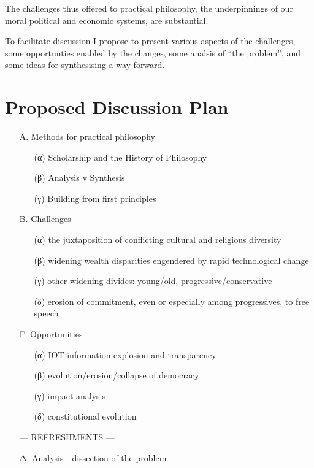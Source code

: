 \documentclass[14pt,titlepage]{extarticle}
\begin{document}
The challenges thus offered to practical philosophy, the underpinnings of our moral political and economic systems, are substantial.

To facilitate discussion I propose to present various aspects of the challenges, some opportunties enabled by the changes, some analsis of ``the problem'', and some ideas for synthesising a way forward.


\pagebreak

\section*{Proposed Discussion Plan}

\begin{itemize}
\item[A.] Methods for practical philosophy
  \begin{itemize}
  \item[(α)] Scholarship and the History of Philosophy
  \item[(β)] Analysis v Synthesis
  \item[(γ)] Building from first principles
  \end{itemize}
\item[B.] Challenges
  \begin{itemize}
  \item[(α)] the juxtaposition of conflicting cultural and religious diversity
  \item[(β)] widening wealth disparities engendered by rapid technological change
  \item[(γ)] other widening divides: young/old, progressive/conservative
  \item[(δ)] erosion of commitment, even or especially among progressives, to free speech
  \end{itemize}
\item[Γ.] Opportunities
  \begin{itemize}
  \item[(α)] IOT information explosion and transparency
  \item[(β)] evolution/erosion/collapse of democracy
  \item[(γ)] impact analysis
  \item[(δ)] constitutional evolution
  \end{itemize}
\item[---] REFRESHMENTS ---
\item[Δ.] Analysis - dissection of the problem
  \begin{itemize}

\end{itemize}
\end{itemize}
\end{document}
